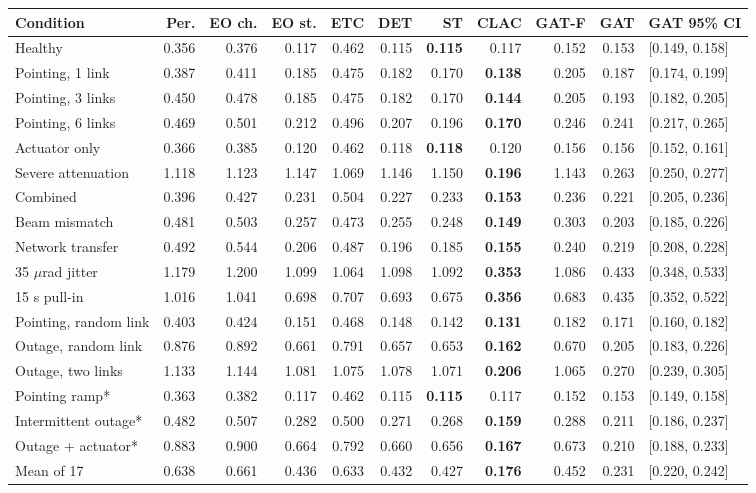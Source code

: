 \begin{tabular}{@{}lrrrrrrrrr@{\,}l@{}}
\toprule
Condition & Per. & EO ch. & EO st. & ETC & DET & ST & CLAC & GAT-F & GAT & \multicolumn{1}{c}{GAT 95\% CI}\\
\midrule
Healthy & 0.356 & 0.376 & 0.117 & 0.462 & 0.115 & \textbf{0.115} & 0.117 & 0.152 & 0.153 & [0.149, 0.158]\\
Pointing, 1 link & 0.387 & 0.411 & 0.185 & 0.475 & 0.182 & 0.170 & \textbf{0.138} & 0.205 & 0.187 & [0.174, 0.199]\\
Pointing, 3 links & 0.450 & 0.478 & 0.185 & 0.475 & 0.182 & 0.170 & \textbf{0.144} & 0.205 & 0.193 & [0.182, 0.205]\\
Pointing, 6 links & 0.469 & 0.501 & 0.212 & 0.496 & 0.207 & 0.196 & \textbf{0.170} & 0.246 & 0.241 & [0.217, 0.265]\\
Actuator only & 0.366 & 0.385 & 0.120 & 0.462 & 0.118 & \textbf{0.118} & 0.120 & 0.156 & 0.156 & [0.152, 0.161]\\
Severe attenuation & 1.118 & 1.123 & 1.147 & 1.069 & 1.146 & 1.150 & \textbf{0.196} & 1.143 & 0.263 & [0.250, 0.277]\\
Combined & 0.396 & 0.427 & 0.231 & 0.504 & 0.227 & 0.233 & \textbf{0.153} & 0.236 & 0.221 & [0.205, 0.236]\\
Beam mismatch & 0.481 & 0.503 & 0.257 & 0.473 & 0.255 & 0.248 & \textbf{0.149} & 0.303 & 0.203 & [0.185, 0.226]\\
Network transfer & 0.492 & 0.544 & 0.206 & 0.487 & 0.196 & 0.185 & \textbf{0.155} & 0.240 & 0.219 & [0.208, 0.228]\\
35 $\mu$rad jitter & 1.179 & 1.200 & 1.099 & 1.064 & 1.098 & 1.092 & \textbf{0.353} & 1.086 & 0.433 & [0.348, 0.533]\\
15 s pull-in & 1.016 & 1.041 & 0.698 & 0.707 & 0.693 & 0.675 & \textbf{0.356} & 0.683 & 0.435 & [0.352, 0.522]\\
Pointing, random link & 0.403 & 0.424 & 0.151 & 0.468 & 0.148 & 0.142 & \textbf{0.131} & 0.182 & 0.171 & [0.160, 0.182]\\
Outage, random link & 0.876 & 0.892 & 0.661 & 0.791 & 0.657 & 0.653 & \textbf{0.162} & 0.670 & 0.205 & [0.183, 0.226]\\
Outage, two links & 1.133 & 1.144 & 1.081 & 1.075 & 1.078 & 1.071 & \textbf{0.206} & 1.065 & 0.270 & [0.239, 0.305]\\
Pointing ramp* & 0.363 & 0.382 & 0.117 & 0.462 & 0.115 & \textbf{0.115} & 0.117 & 0.152 & 0.153 & [0.149, 0.158]\\
Intermittent outage* & 0.482 & 0.507 & 0.282 & 0.500 & 0.271 & 0.268 & \textbf{0.159} & 0.288 & 0.211 & [0.186, 0.237]\\
Outage + actuator* & 0.883 & 0.900 & 0.664 & 0.792 & 0.660 & 0.656 & \textbf{0.167} & 0.673 & 0.210 & [0.188, 0.233]\\
\midrule
Mean of 17 & 0.638 & 0.661 & 0.436 & 0.633 & 0.432 & 0.427 & \textbf{0.176} & 0.452 & 0.231 & [0.220, 0.242]\\
\bottomrule
\end{tabular}
